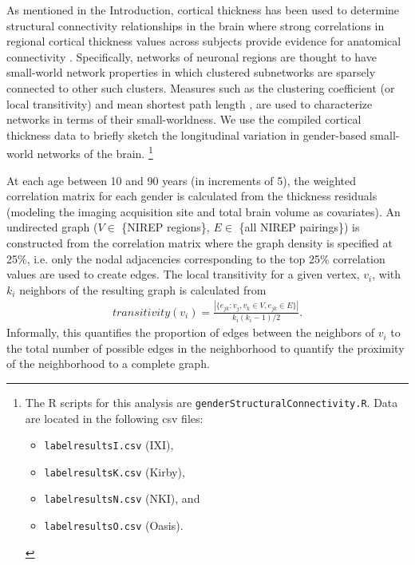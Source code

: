 As mentioned in the Introduction, cortical thickness has
been used to determine structural connectivity relationships in the brain 
where strong correlations in regional cortical 
thickness values across subjects provide evidence for anatomical
connectivity \citep{he2007,chen2008,he2008}.  Specifically, networks of neuronal
regions are thought to have small-world network properties \citep{sporns2004} 
in which clustered subnetworks are sparsely connected to other such clusters.
Measures such as the
clustering coefficient (or local transitivity) and mean shortest path length
\citep{watts1998}, are used to characterize networks in terms of their 
small-worldness.
We use the compiled cortical thickness data to briefly sketch
the longitudinal variation in gender-based small-world networks of the
brain.%
\footnote{
The R scripts for this analysis are {\tt genderStructuralConnectivity.R}.  Data are located in the following csv files: 
\begin{itemize}
\item {\tt labelresultsI.csv} (IXI), 
\item {\tt labelresultsK.csv} (Kirby),
\item {\tt labelresultsN.csv} (NKI), and
\item {\tt labelresultsO.csv} (Oasis).
\end{itemize}
}

At each age between 10 and 90 years (in increments of 5), the weighted correlation
matrix for each gender is calculated from the thickness residuals 
(modeling the imaging acquisition site and total brain volume as covariates).  An undirected graph ($V \in$ \{NIREP regions\}, $E \in$ \{all NIREP pairings\})
is constructed from the correlation matrix where the graph density is specified at 25\%, i.e. only the nodal adjacencies corresponding to the top 25\% correlation values are used to create edges.    The local transitivity for a given vertex, $v_i$, with $k_i$ neighbors of the resulting graph is calculated from
\begin{align}
  transitivity(v_i) = \frac{|\{e_{jk}: v_j, v_k \in V, e_{jk} \in E \}|}{k_i (k_i-1)/2}.
\end{align}
Informally, this quantifies the proportion of edges between the neighbors of $v_i$ to the total number of possible edges in the neighborhood to quantify the proximity of the neighborhood to a complete graph.  


